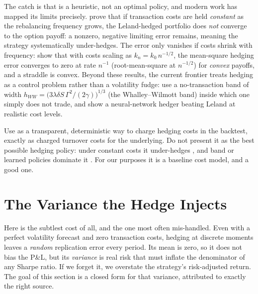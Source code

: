 The catch is that  is a heuristic, not an optimal policy, and modern work has mapped its limits precisely. \citet{KabanovSafarian1997} prove that if transaction costs are held \emph{constant} as the rebalancing frequency grows, the Leland-hedged portfolio does \emph{not} converge to the option payoff: a nonzero, negative limiting error remains, meaning the strategy systematically under-hedges. The error only vanishes if costs shrink with frequency: \citet{LepinetteKabanov2010} show that with costs scaling as $k_n = k_0\,n^{-1/2}$, the mean-square hedging error converges to zero at rate $n^{-1}$ (root-mean-square at $n^{-1/2}$) for \emph{convex} payoffs, and a straddle is convex. Beyond these results, the current frontier treats hedging as a control problem rather than a volatility fudge: \citet{ArzelLehdili2026} use a no-transaction band of width $h_{WW} = \big(3\lambda\delta S\,\Gamma^2/(2\gamma)\big)^{1/3}$ (the Whalley--Wilmott band) inside which one simply does not trade, and \citet{BrugiereTurinici2025} show a neural-network hedger beating Leland at realistic cost levels.

\begin{warning}
Use  as a transparent, deterministic way to charge hedging costs in the backtest, exactly as  charged turnover costs for the underlying. Do not present it as the best possible hedging policy: under constant costs it under-hedges \citep{KabanovSafarian1997}, and band or learned policies dominate it \citep{ArzelLehdili2026, BrugiereTurinici2025}. For our purposes it is a baseline cost model, and a good one.
\end{warning}

\section{The Variance the Hedge Injects}
\label{sec:ivrv:hedging-error}

Here is the subtlest cost of all, and the one most often mis-handled. Even with a perfect volatility forecast and zero transaction costs, hedging at discrete moments leaves a \emph{random} replication error every period. Its mean is zero, so it does not bias the P\&L, but its \emph{variance} is real risk that must inflate the denominator of any Sharpe ratio. If we forget it, we overstate the strategy's risk-adjusted return. The goal of this section is a closed form for that variance, attributed to exactly the right source.

